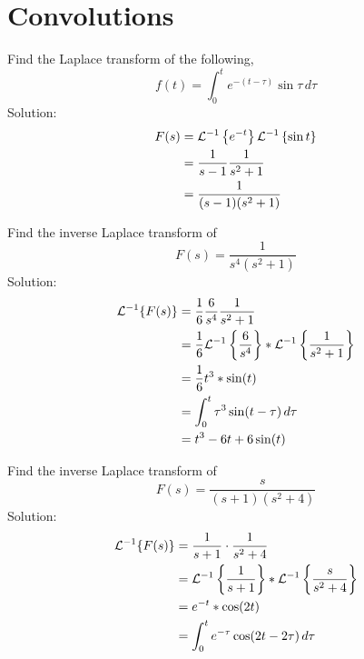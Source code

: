 \documentclass[diffeq.tex]{subfiles}
\begin{document}
\section{Convolutions}
\begin{homework*}[278.5]
    Find the Laplace transform of the following,
    \begin{equation}
        f(t) = \int_{0}^{t}e^{-(t-\tau)}\sin\tau\,d\tau
    \end{equation}
    Solution:
    \begin{alignat}{1}
        F(s) &= \mathcal{L}^{-1}\left\{e^{-t}\right\}\mathcal{L}^{-1}\left\{\sin t\right\}\\
        &= \frac{1}{s - 1}\frac{1}{s^{2} + 1}\\
        &= \frac{1}{(s - 1)(s^{2} + 1)}
    \end{alignat}
\end{homework*}
\begin{homework*}[278.7]
    Find the inverse Laplace transform of
    \begin{equation}
        F(s) = \frac{1}{s^{4}(s^{2} + 1)}
    \end{equation}
    Solution:
    \begin{alignat}{1}
        \mathcal{L}^{-1}\{F(s)\} &= \frac{1}{6}\frac{6}{s^{4}}\frac{1}{s^{2} + 1}\\
        &= \frac{1}{6}\mathcal{L}^{-1}\left\{\frac{6}{s^{4}}\right\}*\mathcal{L}^{-1}\left\{\frac{1}{s^{2} + 1}\right\}\\
        &= \frac{1}{6}t^{3}*\sin(t)\\
        &= \int_{0}^{t}\tau^{3}\sin(t - \tau)\,d\tau\\
        &= t^{3} - 6t + 6\sin(t)
    \end{alignat}
\end{homework*}
\np
\begin{homework*}[278.8]
    Find the inverse Laplace transform of
    \begin{equation}
        F(s) = \frac{s}{(s + 1)(s^{2} + 4)}
    \end{equation}
    Solution:
    \begin{alignat}{1}
        \mathcal{L}^{-1}\{F(s)\} &= \frac{1}{s + 1}\cdot\frac{1}{s^{2} + 4}\\
        &= \mathcal{L}^{-1}\left\{\frac{1}{s + 1}\right\}*\mathcal{L}^{-1}\left\{\frac{s}{s^{2} + 4}\right\}\\
        &= e^{-t}*\cos(2t)\\
        &= \int_{0}^{t}e^{-\tau}\cos(2t-2\tau)\,d\tau
    \end{alignat}
\end{homework*}
\end{document}
